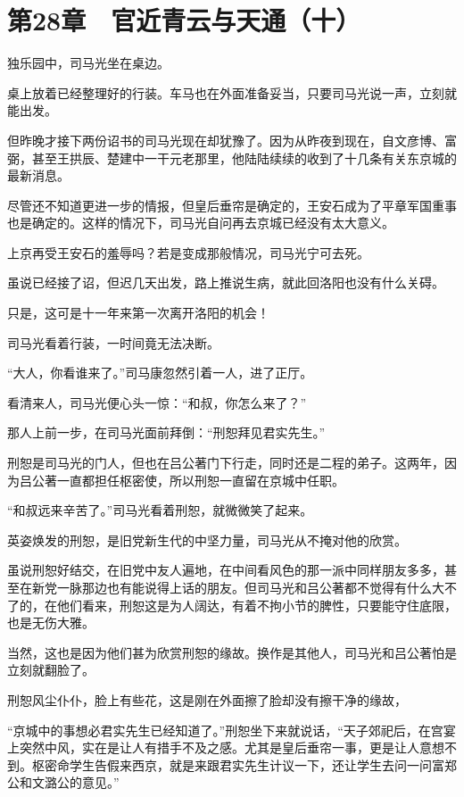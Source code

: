 \section{第28章　官近青云与天通（十）}

独乐园中，司马光坐在桌边。

桌上放着已经整理好的行装。车马也在外面准备妥当，只要司马光说一声，立刻就能出发。

但昨晚才接下两份诏书的司马光现在却犹豫了。因为从昨夜到现在，自文彦博、富弼，甚至王拱辰、楚建中一干元老那里，他陆陆续续的收到了十几条有关东京城的最新消息。

尽管还不知道更进一步的情报，但皇后垂帘是确定的，王安石成为了平章军国重事也是确定的。这样的情况下，司马光自问再去京城已经没有太大意义。

上京再受王安石的羞辱吗？若是变成那般情况，司马光宁可去死。

虽说已经接了诏，但迟几天出发，路上推说生病，就此回洛阳也没有什么关碍。

只是，这可是十一年来第一次离开洛阳的机会！

司马光看着行装，一时间竟无法决断。

“大人，你看谁来了。”司马康忽然引着一人，进了正厅。

看清来人，司马光便心头一惊：“和叔，你怎么来了？”

那人上前一步，在司马光面前拜倒：“刑恕拜见君实先生。”

刑恕是司马光的门人，但也在吕公著门下行走，同时还是二程的弟子。这两年，因为吕公著一直都担任枢密使，所以刑恕一直留在京城中任职。

“和叔远来辛苦了。”司马光看着刑恕，就微微笑了起来。

英姿焕发的刑恕，是旧党新生代的中坚力量，司马光从不掩对他的欣赏。

虽说刑恕好结交，在旧党中友人遍地，在中间看风色的那一派中同样朋友多多，甚至在新党一脉那边也有能说得上话的朋友。但司马光和吕公著都不觉得有什么大不了的，在他们看来，刑恕这是为人阔达，有着不拘小节的脾性，只要能守住底限，也是无伤大雅。

当然，这也是因为他们甚为欣赏刑恕的缘故。换作是其他人，司马光和吕公著怕是立刻就翻脸了。

刑恕风尘仆仆，脸上有些花，这是刚在外面擦了脸却没有擦干净的缘故，

“京城中的事想必君实先生已经知道了。”刑恕坐下来就说话，“天子郊祀后，在宫宴上突然中风，实在是让人有措手不及之感。尤其是皇后垂帘一事，更是让人意想不到。枢密命学生告假来西京，就是来跟君实先生计议一下，还让学生去问一问富郑公和文潞公的意见。”

